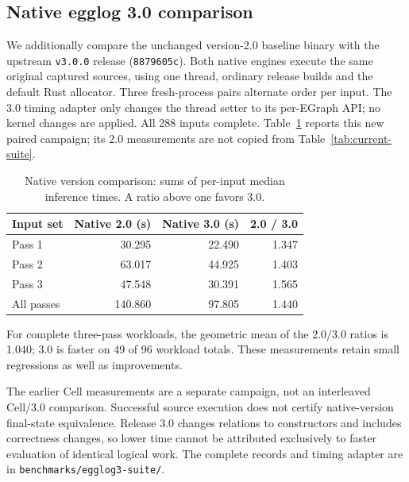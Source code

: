 \subsection{Native egglog 3.0 comparison}

We additionally compare the unchanged version-2.0 baseline binary with the upstream \texttt{v3.0.0} release (\texttt{8879605c}). Both native engines execute the same original captured sources, using one thread, ordinary release builds and the default Rust allocator. Three fresh-process pairs alternate order per input. The 3.0 timing adapter only changes the thread setter to its per-EGraph API; no kernel changes are applied. All 288 inputs complete. Table~\ref{tab:native-three} reports this new paired campaign; its 2.0 measurements are not copied from Table~\ref{tab:current-suite}.

\begin{table}[ht]\centering\small

\begin{tabular}{lrrr}\toprule Input set & Native 2.0 (s) & Native 3.0 (s) & 2.0 / 3.0\\\midrule

Pass 1 & 30.295 & 22.490 & 1.347\\

Pass 2 & 63.017 & 44.925 & 1.403\\

Pass 3 & 47.548 & 30.391 & 1.565\\

All passes & 140.860 & 97.805 & 1.440\\

\bottomrule\end{tabular}

\caption{Native version comparison: sums of per-input median inference times. A ratio above one favors 3.0.}\label{tab:native-three}\end{table}

For complete three-pass workloads, the geometric mean of the 2.0/3.0 ratios is 1.040; 3.0 is faster on 49 of 96 workload totals. These measurements retain small regressions as well as improvements.

The earlier Cell measurements are a separate campaign, not an interleaved Cell/3.0 comparison. Successful source execution does not certify native-version final-state equivalence. Release 3.0 changes relations to constructors and includes correctness changes, so lower time cannot be attributed exclusively to faster evaluation of identical logical work. The complete records and timing adapter are in \texttt{benchmarks/egglog3-suite/}.
